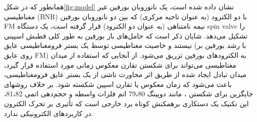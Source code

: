 همانطور که در شکل\ref{fig:model} نشان داده شده است، یک نانوروبان ‌بورفین غیر مغناطیسی (\gls{BNR}) با دو الکترود (به عنوان ناحیه مرکزی) که بین دو نانوروبان ‌بورفین \gls{FM} نیمه نامتناهی (به عنوان دو الکترود) قرار گرفته است، یک دستگاه \gls{spin valve} را تشکیل ‌‌می‌‌دهد. شایان ذکر است که حامل‌های بار ‌بورفین به طور کلی قطبش اسپینی نیستند و خاصیت مغناطیسی توسط یک بستر فرومغناطیسی عایق (با رشد ‌بورفین بر روی عایق \gls{FM}) به الکترودهای ‌بورفین تزریق ‌‌می‌‌شود. از آنجایی که استفاده از ‌میدان مغناطیسی ‌‌می‌‌تواند برای شکستن تقارن معکوس زمانی مورد استفاده قرار گیرد، ‌میدان تبادل ایجاد شده از طریق اثر مجاورت ناشی از یک بستر عایق فرومغناطیسی، باعث ‌‌می‌‌شود که زمان معکوس یا تقارن اسپین شکسته شود. بر خلاف روشهای جایگزین برای شکستن ، مانند دوپینگ 79،80 اتم فلزات واسطه و حجم‌دهی  اتمی‌‌ 81،82، این تکنیک یک دستکاری برهمکنش کوتاه برد خارجی است که تأثیری بر تحرک الکترون در کاربردهای الکترونیکی ندارد. 



